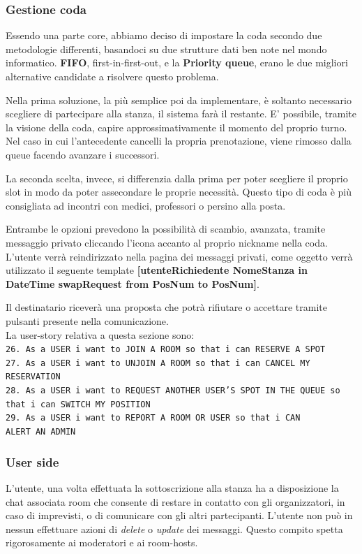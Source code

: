 	\subsubsection{Gestione coda}
	Essendo una parte core, abbiamo deciso di impostare la coda secondo due metodologie differenti, basandoci su due strutture dati ben note nel mondo informatico. \textbf{FIFO}, first-in-first-out, e la \textbf{Priority queue}, erano le due migliori alternative candidate a risolvere questo problema. 
	
	Nella prima soluzione, la più semplice poi da implementare, è soltanto necessario scegliere di partecipare alla stanza, il sistema farà il restante. E' possibile, tramite la visione della coda, capire approssimativamente il momento del proprio turno. Nel caso in cui l'antecedente cancelli la propria prenotazione, viene rimosso dalla queue facendo avanzare i successori.
	
	La seconda scelta, invece, si differenzia dalla prima per poter scegliere il proprio slot in modo da poter assecondare le proprie necessità. Questo tipo di coda è più consigliata ad incontri con medici, professori o persino alla posta.
	
	Entrambe le opzioni prevedono la possibilità di scambio, avanzata, tramite messaggio privato cliccando l'icona accanto al proprio nickname nella coda. L'utente verrà reindirizzato nella pagina dei messaggi privati, come oggetto verrà utilizzato il seguente template \textbf{[utenteRichiedente NomeStanza in DateTime swapRequest from PosNum to PosNum]}. 
	
	Il destinatario riceverà una proposta che potrà rifiutare o accettare tramite pulsanti presente nella comunicazione.\\
	
	La user-story relativa a questa sezione sono:\\
	\texttt{26. As a USER i want to JOIN A ROOM so that i can RESERVE A SPOT}\\
	\texttt{27. As a USER i want to UNJOIN A ROOM so that i can CANCEL MY \\ RESERVATION}\\
	\texttt{28. As a USER i want to REQUEST ANOTHER USER'S SPOT IN THE QUEUE so that i can SWITCH MY POSITION}\\
	\texttt{29. As a USER i want to REPORT A ROOM OR USER so that i CAN \\ ALERT AN ADMIN}
	
	\subsubsection{User side}
	L'utente, una volta effettuata la sottoscrizione alla stanza ha a disposizione la chat associata room che consente di restare in contatto con gli organizzatori, in caso di imprevisti, o di comunicare con gli altri partecipanti. L'utente non può in nessun effettuare azioni di \textit{delete} o \textit{update} dei messaggi. Questo compito spetta rigorosamente ai moderatori e ai room-hosts.
	
